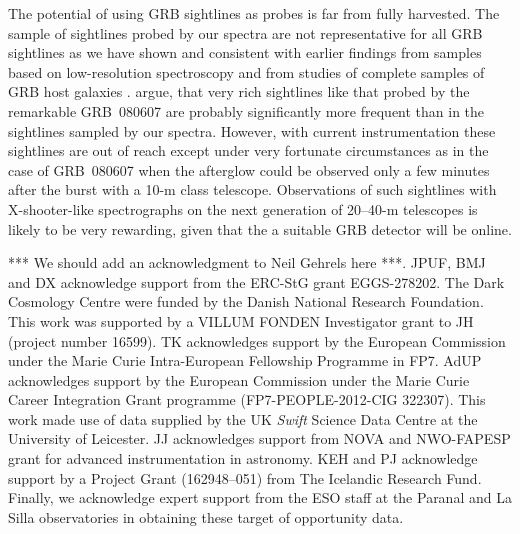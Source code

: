 \documentclass{aa}    %
\begin{document}
The potential of using GRB sightlines as probes is far from fully harvested. The
sample of sightlines probed by our spectra are not representative for all GRB
sightlines as we have shown and consistent with earlier findings from samples
based on low-resolution spectroscopy \citep[e.g.,][]{Fynbo2009} and from studies
of complete samples of GRB host galaxies \citep{Hjorth2012, Covino2013,
	Perley2016}. \cite{Kruhler2013} argue, that very rich sightlines like that
probed by the remarkable GRB~080607 \citep{Prochaska2009} are probably
significantly more frequent than in the sightlines sampled by our spectra.
However, with current instrumentation these sightlines are out of reach except
under very fortunate circumstances as in the case of GRB~080607 when the
afterglow could be observed only a few minutes after the burst with a 10-m class
telescope. Observations of such sightlines with X-shooter-like spectrographs on
the next generation of 20--40-m telescopes is likely to be very rewarding, given
that the a suitable GRB detector will be online.

\begin{acknowledgements}
	*** We should add an acknowledgment to Neil Gehrels here ***. JPUF, BMJ and DX
acknowledge support from the ERC-StG grant EGGS-278202. The Dark Cosmology
Centre were funded by the Danish National Research Foundation. This work was
supported by a VILLUM FONDEN Investigator grant to JH (project number 16599).
TK acknowledges support by the European Commission under the Marie Curie
Intra-European Fellowship Programme in FP7.  AdUP acknowledges support by the
European Commission under the Marie Curie Career Integration Grant programme
(FP7-PEOPLE-2012-CIG 322307).  This work made use of data supplied by the UK
{\it Swift} Science Data Centre at the University of Leicester. JJ acknowledges
support from NOVA and NWO-FAPESP grant for advanced instrumentation in
astronomy. KEH and PJ acknowledge support by a Project Grant (162948--051) from
The Icelandic Research Fund. Finally, we acknowledge expert support from the
ESO staff at the Paranal and La Silla observatories in obtaining these target
of opportunity data.
	
\end{acknowledgements}






\clearpage
\end{document}
